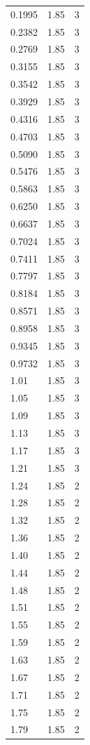 \begin{longtable}{lrr}
  0.1995 & 1.85 & 3 \\
  0.2382 & 1.85 & 3 \\
  0.2769 & 1.85 & 3 \\
  0.3155 & 1.85 & 3 \\
  0.3542 & 1.85 & 3 \\
  0.3929 & 1.85 & 3 \\
  0.4316 & 1.85 & 3 \\
  0.4703 & 1.85 & 3 \\
  0.5090 & 1.85 & 3 \\
  0.5476 & 1.85 & 3 \\
  0.5863 & 1.85 & 3 \\
  0.6250 & 1.85 & 3 \\
  0.6637 & 1.85 & 3 \\
  0.7024 & 1.85 & 3 \\
  0.7411 & 1.85 & 3 \\
  0.7797 & 1.85 & 3 \\
  0.8184 & 1.85 & 3 \\
  0.8571 & 1.85 & 3 \\
  0.8958 & 1.85 & 3 \\
  0.9345 & 1.85 & 3 \\
  0.9732 & 1.85 & 3 \\
  1.01 & 1.85 & 3 \\
  1.05 & 1.85 & 3 \\
  1.09 & 1.85 & 3 \\
  1.13 & 1.85 & 3 \\
  1.17 & 1.85 & 3 \\
  1.21 & 1.85 & 3 \\
  1.24 & 1.85 & 2 \\
  1.28 & 1.85 & 2 \\
  1.32 & 1.85 & 2 \\
  1.36 & 1.85 & 2 \\
  1.40 & 1.85 & 2 \\
  1.44 & 1.85 & 2 \\
  1.48 & 1.85 & 2 \\
  1.51 & 1.85 & 2 \\
  1.55 & 1.85 & 2 \\
  1.59 & 1.85 & 2 \\
  1.63 & 1.85 & 2 \\
  1.67 & 1.85 & 2 \\
  1.71 & 1.85 & 2 \\
  1.75 & 1.85 & 2 \\
  1.79 & 1.85 & 2 \\

\end{longtable}

